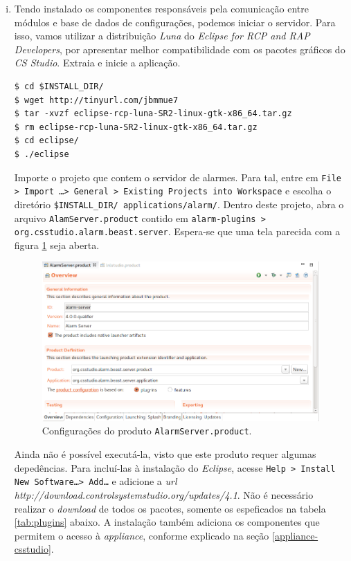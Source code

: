 \begin{enumerate}[i.]
\item Tendo instalado os componentes responsáveis pela comunicação entre módulos
e base de dados de configurações, podemos iniciar o servidor. Para isso, vamos
utilizar a distribuição \textit{Luna} do \textit{Eclipse for RCP and RAP
Developers}, por apresentar melhor compatibilidade com os pacotes gráficos do
\textit{CS Studio}. Extraia e inicie a aplicação.

\begin{lstlisting}[keywordstyle=\ttfamily, style=nonumbers]
$ cd $INSTALL_DIR/
$ wget http://tinyurl.com/jbmmue7
$ tar -xvzf eclipse-rcp-luna-SR2-linux-gtk-x86_64.tar.gz
$ rm eclipse-rcp-luna-SR2-linux-gtk-x86_64.tar.gz
$ cd eclipse/
$ ./eclipse
\end{lstlisting}

Importe o projeto que contem o servidor de alarmes. Para tal, entre em
\texttt{File > Import \ldots > General > Existing Projects into Workspace} e
escolha o diretório \texttt{\$INSTALL\_DIR/ applications/alarm/}. Dentro deste
projeto, abra o arquivo \texttt{AlamServer.product} contido em
\texttt{alarm-plugins > org.csstudio.alarm.beast.server}. Espera-se que uma tela
parecida com a figura \ref{img:product-view} seja aberta.

\FloatBarrier

\begin{figure}[h]

\centering
\includegraphics[scale=0.45]{image/product-view}
\caption {Configurações do produto \texttt{AlarmServer.product}.}
\label{img:product-view} 
\end{figure}

\FloatBarrier

Ainda não é possível executá-la, visto que este produto requer algumas
depedências. Para incluí-las à instalação do \textit{Eclipse}, acesse
\texttt{Help > Install New Software\ldots > Add\ldots} e adicione a \textit{url}
\textit{http://download.controlsystemstudio.org/updates/4.1}. Não é necessário
realizar o \textit{download} de todos os pacotes, somente os espeficados na
tabela \ref{tab:plugins} abaixo. A instalação também adiciona os componentes que
permitem o acesso à \textit{appliance}, conforme explicado na seção
\ref{appliance-csstudio}. 


\end{enumerate}
